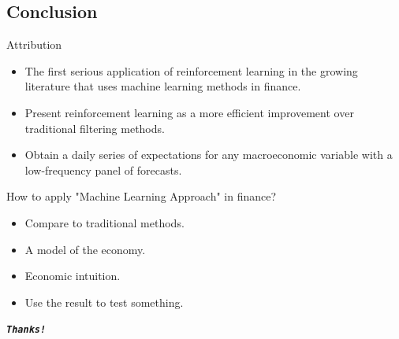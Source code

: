 \documentclass[UTF8, 16pt]{beamer}
\begin{document}
\begin{CJK*}{UTF8}{gbsn}
\section{Conclusion}
\begin{frame}{Attribution}
	\begin{itemize}
		\item The first serious application of \alert{reinforcement learning} in the growing literature that uses machine learning methods in finance.
		\item Present \alert{reinforcement learning} as a more efficient improvement over \alert{traditional filtering} methods.
		\item Obtain a \alert{daily series of expectations} for any macroeconomic variable with a \alert{low-frequency} panel of forecasts.
	\end{itemize}
\end{frame}
\begin{frame}{How to apply "Machine Learning Approach" in finance?}
	\begin{itemize}
		\item Compare to traditional methods.
		\item A model of the economy.
		\item Economic intuition.
		\item Use the result to test something.
	\end{itemize}
\end{frame}
\begin{frame}[allowframebreaks]%
	\begin{center}
		\Huge\textbf{\textit{\texttt{Thanks!}}}
	\end{center}
\end{frame}




\end{CJK*}
\end{document}
